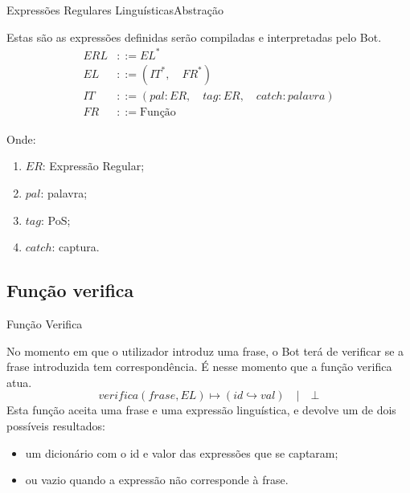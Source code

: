 \documentclass{beamer}
\begin{document}
\begin{frame}{Expressões Regulares Linguísticas}{Abstração}

\hspace{11pt} Estas são as expressões definidas serão compiladas e interpretadas pelo Bot. \\

\begin{align*}
ERL &  ::=  EL^*   \\
EL & ::= ( IT^*, \quad FR^* )\\
IT  &::= ( pal : ER, \quad tag : ER, \quad catch : palavra ) \\
FR &::= \text{Função}
\end{align*}

Onde:
\begin{enumerate}
\item $ER$: Expressão Regular;\\
\item $pal$: palavra; \\
\item $tag$: PoS; \\
\item $catch$: captura.
\end{enumerate}


\end{frame}


\subsection{Função verifica}

\begin{frame}{Função Verifica}

\hspace{11pt} No momento em que o utilizador introduz uma frase, o Bot terá de verificar se a frase introduzida tem correspondência. É nesse momento que a função verifica atua.
\vspace{4mm}
$$
verifica(frase, EL) \mapsto (id \hookrightarrow val) \quad | \quad \bot
$$
\vspace{4mm}
\hspace{11pt} Esta função aceita uma frase e uma expressão linguística, e devolve um de dois possíveis resultados: \begin{itemize}
\item um dicionário com o id e valor das expressões que se captaram;\\
\item ou vazio quando a expressão não corresponde à frase.
\end{itemize}

\end{frame}
\end{document}
